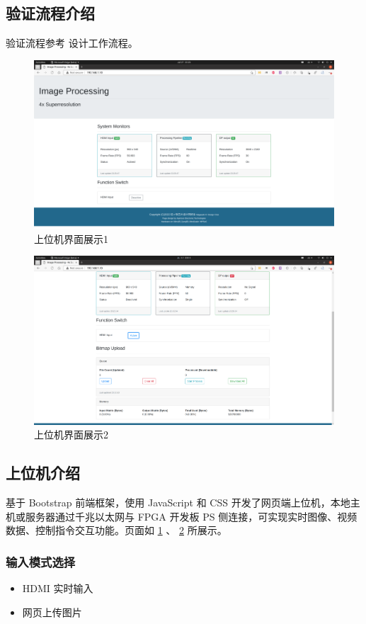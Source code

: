 \documentclass[12pt, a4paper, oneside]{ctexbook}
\begin{document}
	\subsection{验证流程介绍}
	验证流程参考 \textbf{} 设计工作流程。
	\begin{figure}[t]
		\centering
		\includegraphics[scale=0.5]{pic/web0.png}
		\caption{上位机界面展示1}
		\label{web0}
	\end{figure}
	\begin{figure}[t]
		\centering
		\includegraphics[scale=0.5]{pic/web1.png}
		\caption{上位机界面展示2}
		\label{web1}
	\end{figure}
	\subsection{上位机介绍}
	基于 Bootstrap 前端框架，使用 JavaScript 和 CSS 开发了网页端上位机，本地主机或服务器通过千兆以太网与 FPGA 开发板 PS 侧连接，可实现实时图像、视频数据、控制指令交互功能。页面如 \ref{web0} 、 \ref{web1} 所展示。
	
	\newpage
	\subsubsection{输入模式选择}
	\begin{itemize}
		\item HDMI 实时输入
		\item 网页上传图片
	\end{itemize}
\end{document}

